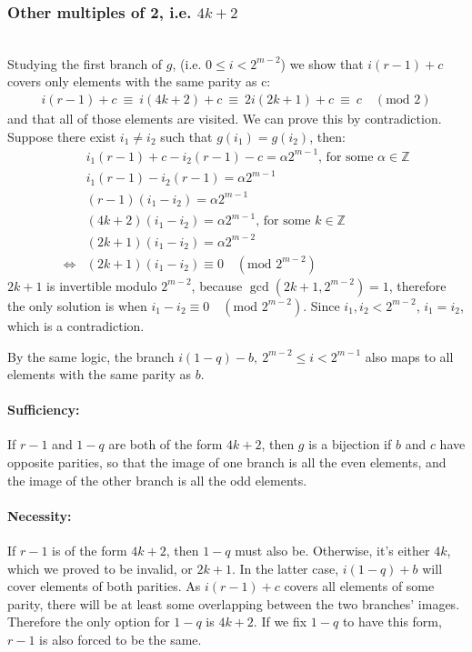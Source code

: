\documentclass[11pt]{llncs}
\begin{document}
\subsubsection{Other multiples of 2, i.e. $4k+2$}\hfill\\
	
Studying the first branch of $g$, (i.e. $0 \leq i < 2^{m-2}$) we show that $i(r-1)+c$ covers only elements with the same parity as c:
\[ \begin{aligned}
i(r-1)+c\ \equiv\ i(4k+2)+c\ \equiv\ 2i(2k+1)+c\ \equiv\ c\quad (\text{mod }2)
\end{aligned} \]
and that all of those elements are visited. We can prove this by contradiction. Suppose there exist $i_1 \neq i_2$ such that $g(i_1) = g(i_2)$, then:
\[ \begin{aligned}
& i_1(r-1)+c - i_2(r-1)-c = \alpha 2^{m-1}\text{, for some }\alpha\in \mathbb{Z} \\
& i_1(r-1) - i_2(r-1) = \alpha 2^{m-1} \\
& (r-1)(i_1-i_2) = \alpha 2^{m-1} \\
& (4k+2)(i_1-i_2) = \alpha 2^{m-1}\text{, for some }k\in \mathbb{Z} \\
& (2k+1)(i_1-i_2) = \alpha 2^{m-2} \\
 \iff & (2k+1)(i_1-i_2) \equiv 0\quad (\text{mod }2^{m-2})
\end{aligned} \]
$2k+1$ is invertible modulo $2^{m-2}$, because $\gcd(2k+1, 2^{m-2}) = 1$, therefore the only solution is when $i_1 - i_2 \equiv 0\quad (\text{mod }2^{m-2})$. Since $i_1, i_2 < 2^{m-2}$, $i_1 = i_2$, which is a contradiction.

By the same logic, the branch $i(1-q)-b,\ 2^{m-2} \leq i < 2^{m-1}$ also maps to all elements with the same parity as $b$.

\paragraph{Sufficiency:}
If $r-1$ and $1-q$ are both of the form $4k+2$, then $g$ is a bijection if $b$ and $c$ have opposite parities, so that the image of one branch is all the even elements, and the image of the other branch is all the odd elements.

\paragraph{Necessity:}
If $r-1$ is of the form $4k+2$, then $1-q$ must also be. Otherwise, it's either $4k$, which we proved to be invalid, or $2k+1$. In the latter case, $i(1-q)+b$ will cover elements of both parities. As $i(r-1)+c$ covers all elements of some parity, there will be at least some overlapping between the two branches' images.  Therefore the only option for $1-q$ is $4k+2$. If we fix $1-q$ to have this form, $r-1$ is also forced to be the same.
\end{document}
